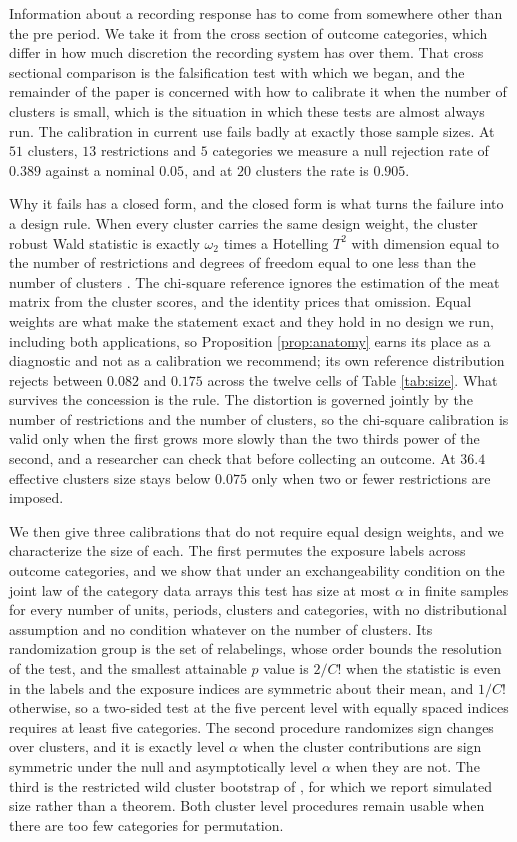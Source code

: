 \documentclass[12pt]{article}
\theoremstyle{definition}
\numberwithin{equation}{section}
\begin{document}
Information about a recording response has to come from somewhere other than the
pre period. We take it from the cross section of outcome categories, which differ
in how much discretion the recording system has over them. That cross sectional
comparison is the falsification test with which we began, and the remainder of
the paper is concerned with how to calibrate it when the number of clusters is
small, which is the situation in which these tests are almost always run. The
calibration in current use fails badly at exactly those sample sizes. At $51$
clusters, $13$ restrictions and $5$ categories we measure a null rejection rate
of $0.389$ against a nominal $0.05$, and at $20$ clusters the rate is $0.905$.

Why it fails has a closed form, and the closed form is what turns the
failure into a design rule. When every cluster carries the same design
weight, the cluster robust Wald statistic is exactly $\omega_2$ times a
Hotelling $T^2$ with dimension equal to the number of restrictions and
degrees of freedom equal to one less than the number of clusters
\citep{hotelling1931}. The chi-square reference ignores the estimation of
the meat matrix from the cluster scores, and the identity prices that
omission. Equal weights are what make the statement exact and they hold in
no design we run, including both applications, so Proposition
\ref{prop:anatomy} earns its place as a diagnostic and not as a
calibration we recommend; its own reference distribution rejects between
$0.082$ and $0.175$ across the twelve cells of Table \ref{tab:size}. What
survives the concession is the rule. The distortion is governed jointly by
the number of restrictions and the number of clusters, so the chi-square
calibration is valid only when the first grows more slowly than the two
thirds power of the second, and a researcher can check that before
collecting an outcome. At $36.4$ effective clusters size stays below
$0.075$ only when two or fewer restrictions are imposed.

We then give three calibrations that do not require equal design weights, and we
characterize the size of each. The first permutes the exposure labels across
outcome categories, and we show that under an exchangeability condition on the
joint law of the category data arrays this test has size at most $\alpha$ in
finite samples for every number of units, periods, clusters and categories, with
no distributional assumption and no condition whatever on the number of
clusters. Its randomization group is the set of relabelings, whose order bounds
the resolution of the test, and the smallest attainable $p$ value is $2/C!$ when the statistic is
even in the labels and the exposure indices are symmetric about their mean, and
$1/C!$ otherwise, so a two-sided test at the five percent level with equally
spaced indices requires at least five categories. The second procedure randomizes
sign changes over clusters, and it is exactly level $\alpha$ when the cluster
contributions are sign symmetric under the null and asymptotically level $\alpha$
when they are not. The third is the restricted wild cluster bootstrap of
\citet{cameron2008bootstrap}, for which we report simulated size rather than a
theorem. Both cluster level procedures remain usable when there are too few
categories for permutation.
\end{document}
